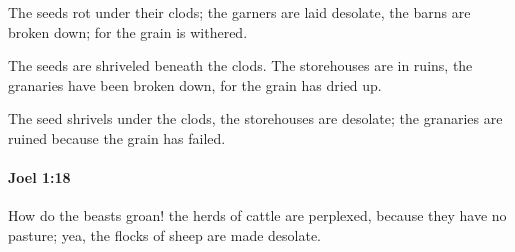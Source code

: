 			\begin{versebox}
					\item[BHS] 
					\item[LXX] 
					\item[ASV] The seeds rot under their clods; the garners are laid desolate, the barns are broken down; for the grain is withered.
					\item[NIV] The seeds are shriveled beneath the clods. The storehouses are in ruins, the granaries have been broken down, for the grain has dried up.
					\item[NRSV] The seed shrivels under the clods, the storehouses are desolate; the granaries are ruined because the grain has failed.
			\end{versebox}

		\paragraph{Joel 1:18} %
			\label{JOEL-1-18}

			How do the beasts groan! the herds of cattle are perplexed, because they have no pasture; yea, the flocks of sheep are made desolate.

